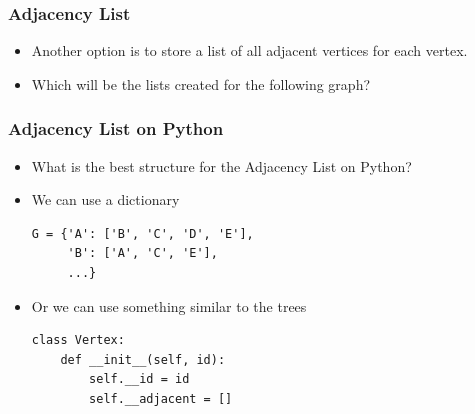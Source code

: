\documentclass[11pt]{beamer}
\begin{document}
\begin{frame}\frametitle{Adjacency List}
\begin{itemize}
\item Another option is to store a list of all adjacent vertices for each vertex.
\pause
\item Which will be the lists created for the following graph?
\end{itemize}
\begin{center}
\end{center}
\end{frame}



\begin{frame}[fragile]\frametitle{Adjacency List on Python}
\begin{itemize}
\item What is the best structure for the Adjacency List on Python?
\pause
\item We can use a dictionary
\begin{lstlisting}
G = {'A': ['B', 'C', 'D', 'E'], 
     'B': ['A', 'C', 'E'],
     ...}
\end{lstlisting}
\pause
\item Or we can use something similar to the trees
\begin{lstlisting}
class Vertex:
    def __init__(self, id):
        self.__id = id
        self.__adjacent = []
\end{lstlisting}
\end{itemize}
\end{frame}
\end{document}
